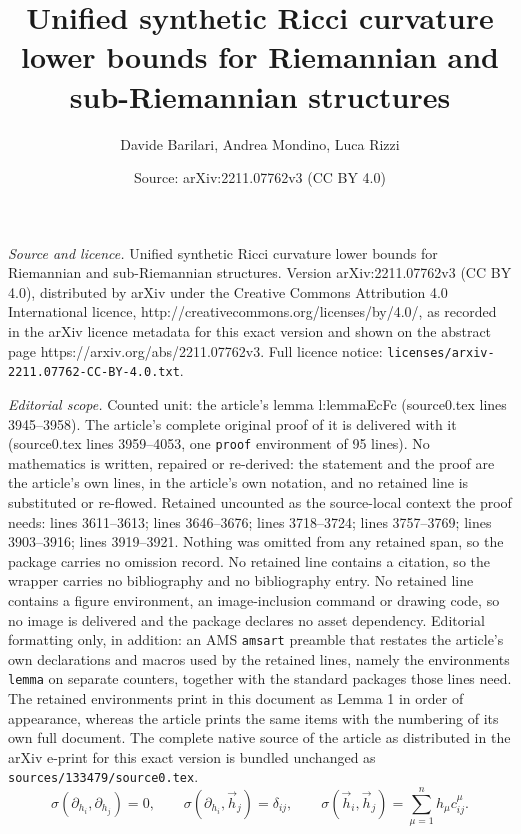 \documentclass[10pt,a4paper]{amsart}
\title{Unified synthetic Ricci curvature lower bounds for Riemannian and sub-Riemannian structures}
\author{Davide Barilari, Andrea Mondino, Luca Rizzi}
\date{Source: arXiv:2211.07762v3 (CC BY 4.0)}
\begin{document}
\maketitle

\noindent\emph{Source and licence.} Unified synthetic Ricci curvature lower bounds for Riemannian and sub-Riemannian structures. Version arXiv:2211.07762v3 (CC BY 4.0), distributed by arXiv under the Creative Commons Attribution 4.0 International licence, http://creativecommons.org/licenses/by/4.0/, as recorded in the arXiv licence metadata for this exact version and shown on the abstract page https://arxiv.org/abs/2211.07762v3. Full licence notice: \texttt{licenses/arxiv-2211.07762-CC-BY-4.0.txt}.\par\smallskip

\noindent\textit{Editorial scope.} Counted unit: the article's lemma l:lemmaEcFc (source0.tex lines 3945--3958). The article's complete original proof of it is delivered with it (source0.tex lines 3959--4053, one \texttt{proof} environment of 95 lines). No mathematics is written, repaired or re-derived: the statement and the proof are the article's own lines, in the article's own notation, and no retained line is substituted or re-flowed.  Retained uncounted as the source-local context the proof needs: lines 3611--3613; lines 3646--3676; lines 3718--3724; lines 3757--3769; lines 3903--3916; lines 3919--3921.  Nothing was omitted from any retained span, so the package carries no omission record.  No retained line contains a citation, so the wrapper carries no bibliography and no bibliography entry.  No retained line contains a figure environment, an image-inclusion command or drawing code, so no image is delivered and the package declares no asset dependency.  Editorial formatting only, in addition: an AMS \texttt{amsart} preamble that restates the article's own declarations and macros used by the retained lines, namely the environments \texttt{lemma} on separate counters, together with the standard packages those lines need.  The retained environments print in this document as Lemma 1 in order of appearance, whereas the article prints the same items with the numbering of its own full document.  The complete native source of the article as distributed in the arXiv e-print for this exact version is bundled unchanged as \texttt{sources/133479/source0.tex}.
\begin{equation}\label{eq:sigmaframe}
\sigma(\partial_{h_i},\partial_{h_j})=0, \qquad \sigma(\partial_{h_i},\vec{h}_j)=\delta_{ij},\qquad \sigma(\vec{h}_i,\vec{h}_j) =  \sum_{\mu=1}^n h_\mu c_{ij}^\mu.
\end{equation}
\end{document}
